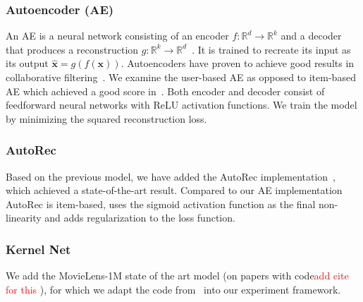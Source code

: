 \documentclass[10pt,conference,compsocconf]{IEEEtran}
\newcommand{\todo}[1]{\textcolor{red}{#1}}
\begin{document}
    \subsubsection{Autoencoder (AE)}
    An AE is a neural network consisting of an encoder $f: \mathbb{R} ^d \rightarrow \mathbb{R} ^k$ and a
    decoder that produces a reconstruction $g: \mathbb{R} ^k \rightarrow \mathbb{R} ^d$~\cite{Goodfellow-et-al-2016}.
    It is trained to recreate its input as its output $\mathbf{ \hat{x} } = g(f(\mathbf{x}))$.
    Autoencoders have proven to achieve good results in collaborative filtering~\cite{inproceedings}.
    We examine the user-based AE as opposed to item-based AE which achieved a good score in~\cite{inproceedings}.
    Both encoder and decoder consist of feedforward neural networks with ReLU activation functions.
    We train the model by minimizing the squared reconstruction loss.

    \subsubsection{AutoRec}
    Based on the previous model, we have added the AutoRec implementation~\cite{inproceedings}, which achieved a state-of-the-art result.
    Compared to our AE implementation AutoRec is item-based, uses the sigmoid activation function as the final non-linearity and adds regularization to the loss function.

    \subsubsection{Kernel Net}
    We add the MovieLens-1M state of the art model (on papers with code\todo{add cite for this }),
    for which we adapt the code from~\cite{pmlr-v80-muller18a, kernelNetGithub} into our experiment framework.

\end{document}
